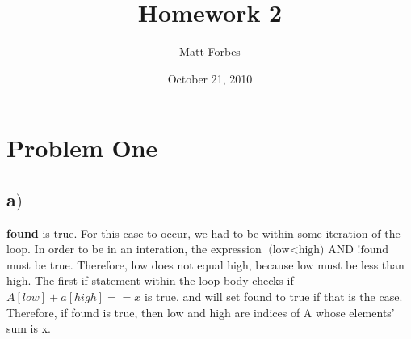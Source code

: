 \documentclass[a4paper,12pt]{article}
\begin{document}
\title{Homework 2}
\author{Matt Forbes}
\date{October 21, 2010}
\maketitle

\newenvironment{indentpar}[1]%
{\begin{list}{}%
         {\setlength{\leftmargin}{#1}}%
         \item[]%
}
{\end{list}}

\section{Problem One}
\subsection*{a\()\)}
{\bf found} is true. For this case to occur, we had to be within some iteration of the loop. In order to be in
an interation, the expression \(\text{(low} < \text{high) AND !found}\) must be true. Therefore, low does not equal
high, because low must be less than high. The first if statement within the loop body checks if
\(A[low] + a[high] ==  x\) is true, and will set found to true if that is the case. Therefore, if found is true,
then low and high are indices of A whose elements' sum is x.
\end{document}
